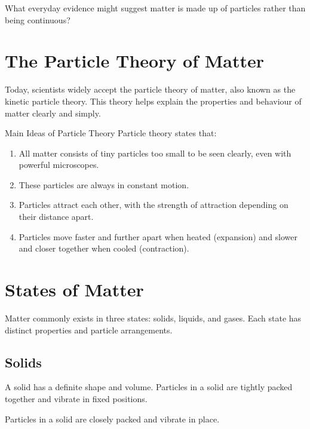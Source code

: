 \begin{stopandthink}
What everyday evidence might suggest matter is made up of particles rather than being continuous?
\end{stopandthink}

\section{The Particle Theory of Matter}

Today, scientists widely accept the particle theory of matter, also known as the kinetic particle theory. This theory helps explain the properties and behaviour of matter clearly and simply.

\begin{keyconcept}{Main Ideas of Particle Theory}
Particle theory states that:
\begin{enumerate}
    \item All matter consists of tiny particles too small to be seen clearly, even with powerful microscopes.
    \item These particles are always in constant motion.
    \item Particles attract each other, with the strength of attraction depending on their distance apart.
    \item Particles move faster and further apart when heated (expansion) and slower and closer together when cooled (contraction).
\end{enumerate}
\end{keyconcept}

\section{States of Matter}

Matter commonly exists in three states: solids, liquids, and gases. Each state has distinct properties and particle arrangements.

\subsection{Solids}

A solid has a definite shape and volume. Particles in a solid are tightly packed together and vibrate in fixed positions.

\begin{marginfigure}
\caption{Particles in a solid are closely packed and vibrate in place.}
\end{marginfigure}

